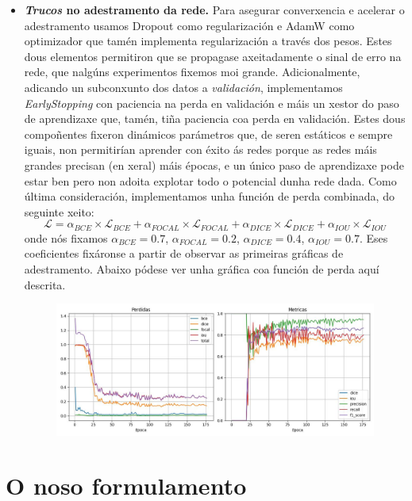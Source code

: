 \documentclass{article}
\begin{document}
\begin{itemize}
\item \textbf{\emph{Trucos} no adestramento da rede.} Para asegurar converxencia e acelerar o adestramento usamos Dropout \cite{srivastava2014dropout} como regularización e AdamW \cite{loshchilov2019decoupled} como optimizador que tamén implementa regularización a través dos pesos. Estes dous elementos permitiron que se propagase axeitadamente o sinal de erro na rede, que nalgúns experimentos fixemos moi grande. Adicionalmente, adicando un subconxunto dos datos a \emph{validación}, implementamos \emph{EarlyStopping} con paciencia na perda en validación e máis un xestor do paso de aprendizaxe que, tamén, tiña paciencia coa perda en validación. Estes dous compoñentes fixeron dinámicos parámetros que, de seren estáticos e sempre iguais, non permitirían aprender con éxito ás redes porque as redes máis grandes precisan (en xeral) máis épocas, e un único paso de aprendizaxe pode estar ben pero non adoita explotar todo o potencial dunha rede dada. Como última consideración, implementamos unha función de perda combinada, do seguinte xeito: \[\mathcal{L} = \alpha_{BCE} \times \mathcal{L}_{BCE} + \alpha_{FOCAL} \times \mathcal{L}_{FOCAL} + \alpha_{DICE} \times \mathcal{L}_{DICE} + \alpha_{IOU} \times \mathcal{L}_{IOU}\] onde nós fixamos $\alpha_{BCE} = 0.7$, $\alpha_{FOCAL} = 0.2$, $\alpha_{DICE} = 0.4$, $\alpha_{IOU} = 0.7$. Eses coeficientes fixáronse a partir de observar as primeiras gráficas de adestramento. Abaixo pódese ver unha gráfica coa función de perda aquí descrita. 

\begin{figure}[H]
	\centering
	\includegraphics[width=\linewidth]{figuras/CU_adTrue_batch10_proc7_canles32_prof4_lr0.001_factocurva_perdida.jpg}
	\label{fig:perdida_funcion}
\end{figure}

\end{itemize}

\section{O noso formulamento}
\end{document}
